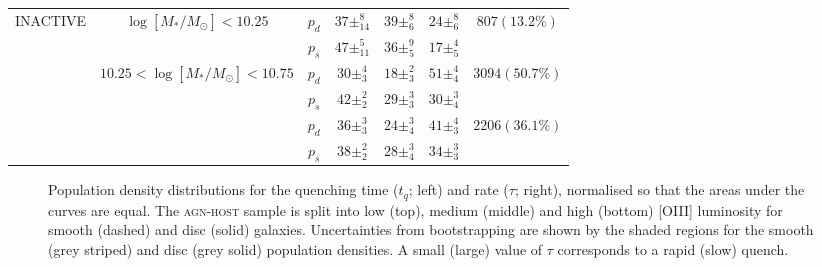 \begin{table}
{{\begin{tabular}{c|c|c|c|c|c|c}
\multirow{6}{*}{INACTIVE}  & \multirow{2}{*}{$\log [M_*/M_{\odot}] < 10.25 $}                       & $p_d$     & $37\pm_{14}^{8}$                    & $39\pm_{6}^{8}$                    & $24\pm_{6}^{8}$        & \multirow{2}{*}{$807 (13.2\%)$}                      \\
                           &                                                 & $p_s$     & $47\pm_{11}^{5}$                    & $36\pm_{5}^{9}$                    & $17\pm_{5}^{4}$        &                                                      \\ \cline{2-7} 
                           & \multirow{2}{*}{$10.25 < \log [M_*/M_{\odot}] < 10.75$}                    & $p_d$     &          $30\pm_{3}^{4}$                          &       $18\pm_{3}^{2}$                            &    $51\pm_{4}^{4}$                   & \multirow{2}{*}{$3094 (50.7\%)$}                     \\
                           &                                                 & $p_s$     & $42\pm_{2}^{2}$            & $29\pm_{3}^{3}$   & $30\pm_{4}^{3}$ &                                                      \\ \cline{2-7} 
                           & {\multirow{2}{*}{$\log [M_*/M_{\odot}] > 10.75$}} & $p_d$     & $36\pm_{3}^{3}$            & $24\pm_{4}^{3}$         & $41\pm_{3}^{4}$ & \multicolumn{1}{l}{\multirow{2}{*}{$2206 (36.1\%)$}} \\
                           & \multicolumn{1}{l|}{}                           & $p_s$      & $38\pm_{2}^{2}$              & $28\pm_{4}^{3}$            & $34\pm_{3}^{3}$ & \multicolumn{1}{l}{}                                 \\ \hline                       
\end{tabular}}}
\end{table}

\begin{figure}
\caption[Quenching time and rate population density distributions for the \textsc{agn-host} sample split by AGN luminosity]{Population density distributions for the quenching time ($t_q$; left) and rate ($\tau$; right), normalised so that the areas under the curves are equal. The \textsc{agn-host} sample is split into low (top), medium (middle) and high (bottom) [OIII] luminosity for smooth (dashed) and disc (solid) galaxies. Uncertainties from bootstrapping are shown by the shaded regions for the smooth (grey striped) and disc (grey solid) population densities. A small (large) value of $\tau$ corresponds to a rapid (slow) quench.}
\label{rate}
\end{figure}

